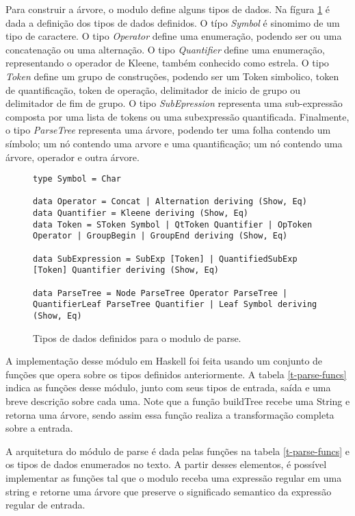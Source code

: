 Para construir a árvore, o modulo define alguns tipos de dados.
Na fígura \ref{f-data-parse} é dada a definição dos tipos de dados definidos.
O típo \emph{Symbol} é sinomimo de um tipo de caractere.
O tipo \emph{Operator} define uma enumeração, podendo ser ou uma concatenação ou uma alternação.
O tipo \emph{Quantifier} define uma enumeração, representando o operador de Kleene, também conhecido como estrela.
O tipo \emph{Token} define um grupo de construções, podendo ser um Token simbolico, token de quantificação, token de operação, delimitador de inicio de grupo ou delimitador de fim de grupo.
O tipo \emph{SubEpression} representa uma sub-expressão composta por uma lista de tokens ou uma subexpressão quantificada.
Finalmente, o tipo \emph{ParseTree} representa uma árvore, podendo ter uma folha contendo um símbolo; um nó contendo uma arvore e uma quantificação; um nó contendo uma árvore, operador e outra árvore.


\begin{figure}
\begin{lstlisting}
type Symbol = Char

data Operator = Concat | Alternation deriving (Show, Eq)
data Quantifier = Kleene deriving (Show, Eq)
data Token = SToken Symbol | QtToken Quantifier | OpToken Operator | GroupBegin | GroupEnd deriving (Show, Eq)

data SubExpression = SubExp [Token] | QuantifiedSubExp [Token] Quantifier deriving (Show, Eq)

data ParseTree = Node ParseTree Operator ParseTree | QuantifierLeaf ParseTree Quantifier | Leaf Symbol deriving (Show, Eq)

\end{lstlisting}
\caption{Tipos de dados definidos para o modulo de parse.}
\label{f-data-parse}
\end{figure}


A implementação desse módulo em Haskell foi feita usando um conjunto de funções que opera sobre os tipos definidos anteriormente.
A tabela \ref{t-parse-funcs} indica as funções desse módulo, junto com seus tipos de entrada, saída e uma breve descrição sobre cada uma.
Note que a função buildTree recebe uma String e retorna uma árvore, sendo assim essa função realiza a transformação completa sobre a entrada.



A arquitetura do módulo de parse é dada pelas funções na tabela \ref{t-parse-funcs} e os tipos de dados enumerados no texto.
A partir desses elementos, é possível implementar as funções tal que o modulo receba uma expressão regular em uma string e retorne uma árvore que preserve o significado semantico da expressão regular de entrada.

